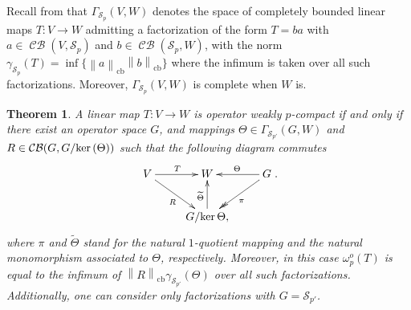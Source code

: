 \documentclass[11pt]{amsart}
\DeclareMathOperator{\cb}{cb}
\DeclareMathOperator{\CB}{\mathcal{CB}}
\newcommand{\n}[1]{ \left\|#1\right\| }
\newtheorem{theorem}{Theorem}[section]
\numberwithin{equation}{section}
\def\ker{{\rm ker\, }}
\begin{document}
Recall from \cite[Sec. 7.2]{Pisier-Asterisque} that $\Gamma_{\mathcal{S}_p}(V,W)$ denotes the space of completely bounded linear maps $T: V \to W$ admitting a factorization of the form $T = ba$ with $a\in\CB(V,\mathcal{S}_p)$ and $b\in\CB(\mathcal{S}_p,W)$, with the norm $\gamma_{\mathcal{S}_p}(T) = \inf \{ \n{a}_{\cb} \n{b}_{\cb}\}$ where the infimum is taken over all such factorizations. Moreover, $\Gamma_{\mathcal{S}_p}(V,W)$ is complete when $W$ is.


\begin{theorem}\label{thm-factorization-weakly-p-compact}
A linear map $T : V \to W$ is operator weakly $p$-compact if and only if there exist an operator space $G$, and mappings $\Theta \in \Gamma_{\mathcal{S}_{p'}}(G, W)$ and $R \in\CB(G,G/\ker(\Theta))$ such that the following diagram commutes
\begin{equation}\label{eqn-factorization-weakly-p-compact}
\xymatrix{
V \ar[r]^T\ar[rd]_R    & W  & \ar[l]_{\Theta } \ar@{->>}[ld]^{\pi}  G \\
 &   G/\ker\Theta  \ar[u]^{\widetilde{\Theta}},  &
}.
\end{equation}
where $\pi$ and $\widetilde{\Theta}$  stand for the natural $1$-quotient mapping and the natural monomorphism associated to $\Theta$, respectively.
Moreover, in this case $\omega_p^o(T)$ is equal to the infimum of $\n{R}_{\cb}\gamma_{\mathcal{S}_{p'}}(\Theta)$ over all such factorizations.
Additionally, one can consider only factorizations with $G=\mathcal{S}_{p'}$.
\end{theorem}
\end{document}
